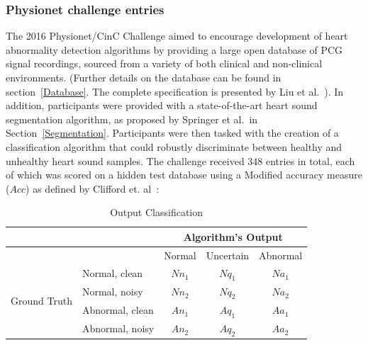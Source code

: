 \documentclass[titlepage, 12pt]{scrartcl} \usepackage{enumitem}
\begin{document}
\subsubsection{Physionet challenge entries}\label{ChallengeEnt}
\doublespacing
The 2016 Physionet/CinC Challenge aimed to encourage development of heart
abnormality detection algorithms by providing a large open database of PCG
signal recordings, sourced from a variety of both clinical and non-clinical
environments. (Further details on the database can be found in
section~\ref{Database}. The complete specification is presented by Liu et al.~\parencite{Liu2016}). In addition, participants were provided with a
state-of-the-art heart sound segmentation algorithm, as proposed by Springer
et al.\ in Section~\ref{Segmentation}. Participants were then tasked with the
creation of a classification algorithm that could robustly discriminate between
healthy and unhealthy heart sound samples. The challenge received 348 entries
in total, each of which was scored on a hidden test database
using a Modified accuracy measure ($Acc$) as defined by Clifford et.
al~\parencite{Clifford2016}:
\begin{table}[htbp]
\centering
\caption{Output Classification}
\label{OutputClassification}
\doublespacing
\begin{tabular}{llccc}
\hline
                              &                 & \multicolumn{3}{c}{Algorithm's Output}                                                    \\ \hline
                              &                 & \multicolumn{1}{l}{Normal} & \multicolumn{1}{l}{Uncertain} & \multicolumn{1}{l}{Abnormal} \\
\multirow{4}{*}{Ground Truth} & Normal, clean   & $Nn_1$                     & $Nq_1$                        & $Na_1$                       \\
                              & Normal, noisy   & $Nn_2$                     & $Nq_2$                        & $Na_2$                       \\
                              & Abnormal, clean & $An_1$                     & $Aq_1$                        & $Aa_1$                       \\
                              & Abnormal, noisy & $An_2$                     & $Aq_2$                        & $Aa_2$                       \\ \hline
\end{tabular}
\end{table}
\end{document}
